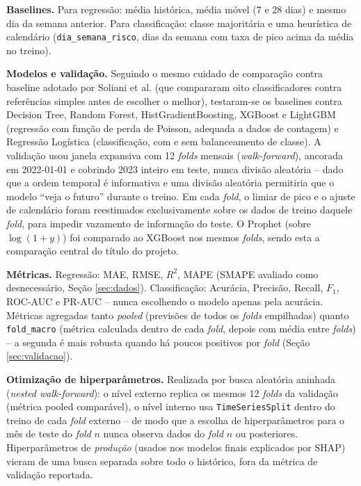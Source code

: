 \documentclass[12pt]{article}
\begin{document}
\textbf{Baselines.} Para regressão: média histórica, média móvel (7 e 28
dias) e mesmo dia da semana anterior. Para classificação: classe
majoritária e uma heurística de calendário (\texttt{dia\_semana\_risco},
dias da semana com taxa de pico acima da média no treino).

\textbf{Modelos e validação.} Seguindo o mesmo cuidado de comparação
contra baseline adotado por Soliani et al. \cite{soliani2024} (que
compararam oito classificadores contra referências simples antes de
escolher o melhor), testaram-se os baselines contra Decision Tree, Random
Forest, HistGradientBoosting, XGBoost \cite{chen2016} e LightGBM
(regressão com função de perda de Poisson, adequada a dados de contagem)
e Regressão Logística (classificação, com e sem balanceamento de classe).
A validação usou janela expansiva com 12 \emph{folds} mensais
(\emph{walk-forward}), ancorada em 2022-01-01 e cobrindo 2023 inteiro em
teste, nunca divisão aleatória -- dado que a ordem temporal é informativa
e uma divisão aleatória permitiria que o modelo ``veja o futuro'' durante
o treino. Em cada \emph{fold}, o limiar de pico e o ajuste de calendário
foram reestimados exclusivamente sobre os dados de treino daquele
\emph{fold}, para impedir vazamento de informação do teste. O Prophet
\cite{taylor2018} (sobre $\log(1+y)$) foi comparado ao XGBoost nos mesmos
\emph{folds}, sendo esta a comparação central do título do projeto.

\textbf{Métricas.} Regressão: MAE, RMSE, $R^2$, MAPE (SMAPE avaliado como
desnecessário, Seção \ref{sec:dados}). Classificação: Acurácia,
Precisão, Recall, $F_1$, ROC-AUC e PR-AUC -- nunca escolhendo o modelo
apenas pela acurácia. Métricas agregadas tanto \emph{pooled} (previsões
de todos os \emph{folds} empilhadas) quanto \texttt{fold\_macro} (métrica
calculada dentro de cada \emph{fold}, depois com média entre
\emph{folds}) -- a segunda é mais robusta quando há poucos positivos por
\emph{fold} (Seção \ref{sec:validacao}).

\textbf{Otimização de hiperparâmetros.} Realizada por busca aleatória
aninhada (\emph{nested walk-forward}): o nível externo replica os mesmos
12 \emph{folds} da validação (métrica pooled comparável), o nível interno
usa \texttt{TimeSeriesSplit} dentro do treino de cada \emph{fold}
externo -- de modo que a escolha de hiperparâmetros para o mês de teste
do \emph{fold} $n$ nunca observa dados do \emph{fold} $n$ ou posteriores.
Hiperparâmetros de \emph{produção} (usados nos modelos finais explicados
por SHAP) vieram de uma busca separada sobre todo o histórico, fora da
métrica de validação reportada.
\end{document}

